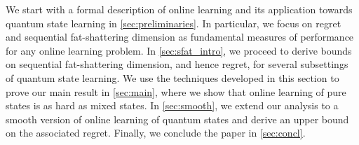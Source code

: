 We start with a formal description of online learning and its application towards quantum state learning in \cref{sec:preliminaries}. In particular, we focus on regret and sequential fat-shattering dimension as fundamental measures of performance for any online learning problem. In \cref{sec:sfat_intro}, we proceed to derive bounds on sequential fat-shattering dimension, and hence regret, for several subsettings of quantum state learning. We use the techniques developed in this section to prove our main result in \cref{sec:main}, where we show that online learning of pure states is as hard as mixed states. In \cref{sec:smooth}, we extend our analysis to a smooth version of online learning of quantum states and derive an upper bound on the associated regret. Finally, we conclude the paper in \cref{sec:concl}.
